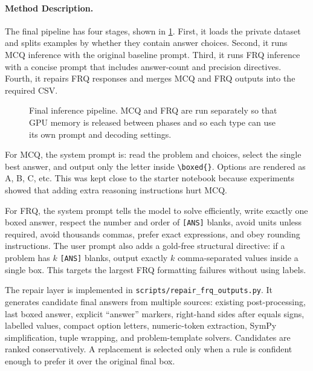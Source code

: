 \documentclass{article}
\begin{document}
\paragraph{Method Description.}
The final pipeline has four stages, shown in \cref{fig:pipeline}. First, it loads the private dataset and splits examples by whether they contain answer choices. Second, it runs MCQ inference with the original baseline prompt. Third, it runs FRQ inference with a concise prompt that includes answer-count and precision directives. Fourth, it repairs FRQ responses and merges MCQ and FRQ outputs into the required CSV.

\begin{figure}[h]
\centering
{}
\caption{Final inference pipeline. MCQ and FRQ are run separately so that GPU memory is released between phases and so each type can use its own prompt and decoding settings.}
\label{fig:pipeline}
\end{figure}

For MCQ, the system prompt is: read the problem and choices, select the single best answer, and output only the letter inside \texttt{\textbackslash boxed\{\}}. Options are rendered as A, B, C, etc. This was kept close to the starter notebook because experiments showed that adding extra reasoning instructions hurt MCQ.

For FRQ, the system prompt tells the model to solve efficiently, write exactly one boxed answer, respect the number and order of \texttt{[ANS]} blanks, avoid units unless required, avoid thousands commas, prefer exact expressions, and obey rounding instructions. The user prompt also adds a gold-free structural directive: if a problem has $k$ \texttt{[ANS]} blanks, output exactly $k$ comma-separated values inside a single box. This targets the largest FRQ formatting failures without using labels.

The repair layer is implemented in \texttt{scripts/repair\_frq\_outputs.py}. It generates candidate final answers from multiple sources: existing post-processing, last boxed answer, explicit ``answer'' markers, right-hand sides after equals signs, labelled values, compact option letters, numeric-token extraction, SymPy simplification, tuple wrapping, and problem-template solvers. Candidates are ranked conservatively. A replacement is selected only when a rule is confident enough to prefer it over the original final box.
\end{document}
